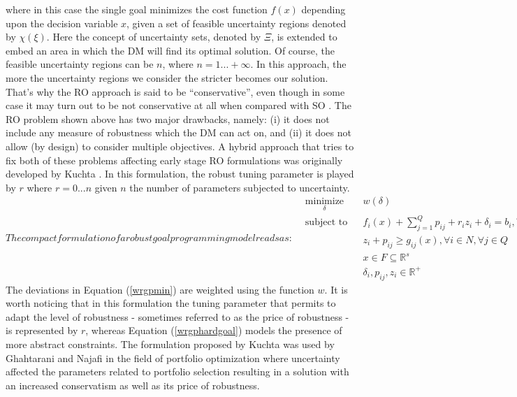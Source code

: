 \documentclass[conference,final,a4paper]{IEEEtran}
\begin{document}
where in this case the single goal minimizes the cost function $f(x)$ depending upon the decision variable $x$, given a set of feasible uncertainty regions denoted by $\chi(\xi)$. Here the concept of uncertainty sets, denoted by $\Xi$, is extended to embed an area in which the DM will find its optimal solution. Of course, the feasible uncertainty regions can be $n$, where $n=1...+\infty$. In this approach, the more the uncertainty regions we consider the stricter becomes our solution. That's why the RO approach is said to be ``conservative'', even though in some case it may turn out to be not conservative at all when compared with SO \cite{ben-tal09}. The RO problem shown above has two major drawbacks, namely: (i) it does not include any measure of robustness which the DM can act on, and (ii) it does not allow (by design) to consider multiple objectives. A hybrid approach that tries to fix both of these problems affecting early stage RO formulations
was originally developed by Kuchta \cite{kuchta04}. In this formulation, the
robust tuning parameter is played by \(r\) where \(r=0...n\) given \(n\)
the number of parameters subjected to uncertainty.
\begin{subequations}
The compact formulation of a robust goal programming model reads as:
\begin{align}
    & \underset{\delta}{\text{minimize}} & & w(\delta) \label{wrgpmin} \\
    & \text{subject to} & & f_i(x) + \sum_{j=1}^{Q}p_{ij} + r_iz_i + \delta_i = b_i, \forall i \in N  \label{wrgpsoftgoal} \\
    & & & z_i + p_{ij} \geq g_{ij}(x), \forall i \in N , \forall j \in Q \label{wrgptuning} \\
    & & & x\in F \subseteq \mathbb{R}^{s} \label{wrgphardgoal} \\
    & & & \delta_i, p_{ij}, z_i \in \mathbb{R}^{+} \label{wrgppositivity}
\end{align}
\end{subequations}
The deviations in Equation (\ref{wrgpmin}) are weighted using the function $w$. It is worth noticing that in this formulation the tuning parameter that permits to adapt the level of robustness - sometimes referred to as the price of robustness \cite{bertsimas04} - is represented by \(r\), whereas Equation (\ref{wrgphardgoal}) models the presence of more abstract constraints. The formulation proposed by Kuchta was used by Ghahtarani and Najafi in the field of portfolio optimization \cite{ghahtarani13} where uncertainty affected the parameters related to portfolio selection resulting in a solution with an increased conservatism as well as its price of robustness.
\end{document}
